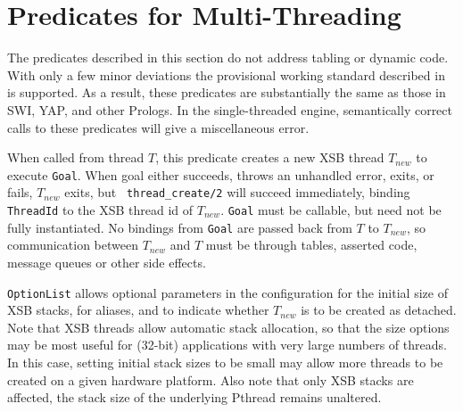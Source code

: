\section{Predicates for Multi-Threading} \label{sec:mt-threading}

The predicates described in this section do not address tabling or
dynamic code.  With only a few minor deviations the provisional
working standard described in \cite{Prolog-MT-ISO} is supported.  As a
result, these predicates are substantially the same as those in SWI,
YAP, and other Prologs.  In the single-threaded engine, semantically
correct calls to these predicates will give a miscellaneous error.

\begin{description}

%
When called from thread $T$, this predicate creates a new XSB thread
$T_{new}$ to execute {\tt Goal}.  When goal either succeeds, throws an
unhandled error, exits, or fails, $T_{new}$ exits, but {\tt
  thread\_create/2} will succeed immediately, binding {\tt ThreadId}
to the XSB thread id of $T_{new}$.  {\tt Goal} must be callable, but
need not be fully instantiated.  No bindings from {\tt Goal} are
passed back from $T$ to $T_{new}$, so communication between $T_{new}$
and $T$ must be through tables, asserted code, message queues or other
side effects.

{\tt OptionList} allows optional parameters in the configuration for
the initial size of XSB stacks, for aliases, and to indicate whether
$T_{new}$ is to be created as detached.  Note that XSB threads allow
automatic stack allocation, so that the size options may be most
useful for (32-bit) applications with very large numbers of threads.
In this case, setting initial stack sizes to be small may allow more
threads to be created on a given hardware platform.  Also note that
only XSB stacks are affected, the stack size of the underlying Pthread
remains unaltered.
%
\bi


\end{description}
